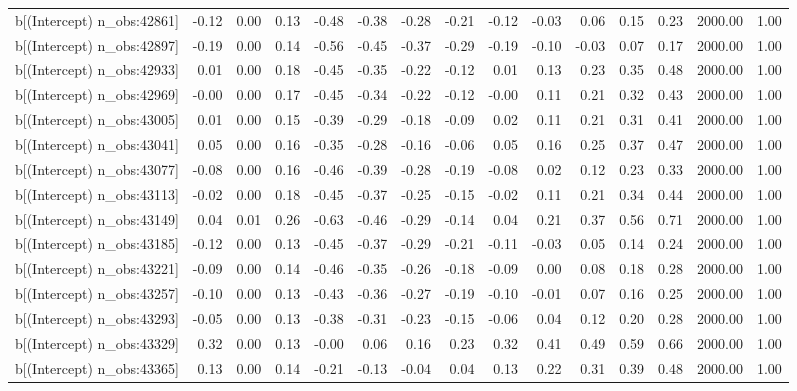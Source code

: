 \begin{table}[ht]
\begin{tabular}{rrrrrrrrrrrrrrr}
  b[(Intercept) n\_obs:42861] & -0.12 & 0.00 & 0.13 & -0.48 & -0.38 & -0.28 & -0.21 & -0.12 & -0.03 & 0.06 & 0.15 & 0.23 & 2000.00 & 1.00 \\ 
  b[(Intercept) n\_obs:42897] & -0.19 & 0.00 & 0.14 & -0.56 & -0.45 & -0.37 & -0.29 & -0.19 & -0.10 & -0.03 & 0.07 & 0.17 & 2000.00 & 1.00 \\ 
  b[(Intercept) n\_obs:42933] & 0.01 & 0.00 & 0.18 & -0.45 & -0.35 & -0.22 & -0.12 & 0.01 & 0.13 & 0.23 & 0.35 & 0.48 & 2000.00 & 1.00 \\ 
  b[(Intercept) n\_obs:42969] & -0.00 & 0.00 & 0.17 & -0.45 & -0.34 & -0.22 & -0.12 & -0.00 & 0.11 & 0.21 & 0.32 & 0.43 & 2000.00 & 1.00 \\ 
  b[(Intercept) n\_obs:43005] & 0.01 & 0.00 & 0.15 & -0.39 & -0.29 & -0.18 & -0.09 & 0.02 & 0.11 & 0.21 & 0.31 & 0.41 & 2000.00 & 1.00 \\ 
  b[(Intercept) n\_obs:43041] & 0.05 & 0.00 & 0.16 & -0.35 & -0.28 & -0.16 & -0.06 & 0.05 & 0.16 & 0.25 & 0.37 & 0.47 & 2000.00 & 1.00 \\ 
  b[(Intercept) n\_obs:43077] & -0.08 & 0.00 & 0.16 & -0.46 & -0.39 & -0.28 & -0.19 & -0.08 & 0.02 & 0.12 & 0.23 & 0.33 & 2000.00 & 1.00 \\ 
  b[(Intercept) n\_obs:43113] & -0.02 & 0.00 & 0.18 & -0.45 & -0.37 & -0.25 & -0.15 & -0.02 & 0.11 & 0.21 & 0.34 & 0.44 & 2000.00 & 1.00 \\ 
  b[(Intercept) n\_obs:43149] & 0.04 & 0.01 & 0.26 & -0.63 & -0.46 & -0.29 & -0.14 & 0.04 & 0.21 & 0.37 & 0.56 & 0.71 & 2000.00 & 1.00 \\ 
  b[(Intercept) n\_obs:43185] & -0.12 & 0.00 & 0.13 & -0.45 & -0.37 & -0.29 & -0.21 & -0.11 & -0.03 & 0.05 & 0.14 & 0.24 & 2000.00 & 1.00 \\ 
  b[(Intercept) n\_obs:43221] & -0.09 & 0.00 & 0.14 & -0.46 & -0.35 & -0.26 & -0.18 & -0.09 & 0.00 & 0.08 & 0.18 & 0.28 & 2000.00 & 1.00 \\ 
  b[(Intercept) n\_obs:43257] & -0.10 & 0.00 & 0.13 & -0.43 & -0.36 & -0.27 & -0.19 & -0.10 & -0.01 & 0.07 & 0.16 & 0.25 & 2000.00 & 1.00 \\ 
  b[(Intercept) n\_obs:43293] & -0.05 & 0.00 & 0.13 & -0.38 & -0.31 & -0.23 & -0.15 & -0.06 & 0.04 & 0.12 & 0.20 & 0.28 & 2000.00 & 1.00 \\ 
  b[(Intercept) n\_obs:43329] & 0.32 & 0.00 & 0.13 & -0.00 & 0.06 & 0.16 & 0.23 & 0.32 & 0.41 & 0.49 & 0.59 & 0.66 & 2000.00 & 1.00 \\ 
  b[(Intercept) n\_obs:43365] & 0.13 & 0.00 & 0.14 & -0.21 & -0.13 & -0.04 & 0.04 & 0.13 & 0.22 & 0.31 & 0.39 & 0.48 & 2000.00 & 1.00 \\ 

\end{tabular}
\end{table}
